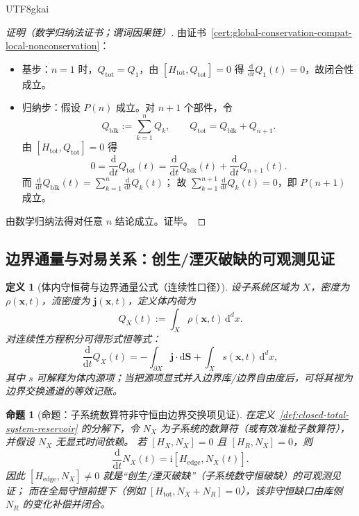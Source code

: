 \documentclass[12pt]{article}
\newtheorem{definition}{定义}[section]
\newtheorem{proposition}{命题}[section]
\begin{document}
\begin{CJK*}{UTF8}{gkai}
\begin{proof}[证明（数学归纳法证书；谓词因果链）]
由证书~\ref{cert:global-conservation-compat-local-nonconservation}：
\begin{itemize}
  \item 基步：$n=1$ 时，$Q_{\mathrm{tot}}=Q_1$，由 $[H_{\mathrm{tot}},Q_{\mathrm{tot}}]=0$ 得 $\frac{\mathrm{d}}{\mathrm{d}t}
    Q_1(t)=0$，故闭合性成立。
  \item 归纳步：假设 $P(n)$ 成立。对 $n+1$ 个部件，令
  \[
    Q_{\mathrm{blk}}:=\sum_{k=1}^{n}Q_k,\qquad Q_{\mathrm{tot}}=Q_{\mathrm{blk}}+Q_{n+1}.
  \]
  由 $[H_{\mathrm{tot}},Q_{\mathrm{tot}}]=0$ 得
  \[
    0=\frac{\mathrm{d}}{\mathrm{d}t}Q_{\mathrm{tot}}(t)=\frac{\mathrm{d}}{\mathrm{d}t}Q_{\mathrm{blk}}(t)
      +\frac{\mathrm{d}}{\mathrm{d}t}Q_{n+1}(t).
  \]
  而 $\frac{\mathrm{d}}{\mathrm{d}t}Q_{\mathrm{blk}}(t)=\sum_{k=1}^{n}\frac{\mathrm{d}}{\mathrm{d}t}Q_k(t)$；
  故 $\sum_{k=1}^{n+1}\frac{\mathrm{d}}{\mathrm{d}t}Q_k(t)=0$，即 $P(n+1)$ 成立。
\end{itemize}
由数学归纳法得对任意 $n$ 结论成立。证毕。
\end{proof}

\subsection{边界通量与对易关系：创生/湮灭破缺的可观测见证}
\label{sec:boundary-flux-and-commutator-witness}

\begin{definition}[体内守恒荷与边界通量公式（连续性口径）]
设子系统区域为 $X$，密度为 $\rho(\mathbf{x},t)$，流密度为 $\mathbf{j}(\mathbf{x},t)$，定义体内荷为
\[
  Q_X(t):=\int_{X}\rho(\mathbf{x},t)\,\mathrm{d}^d x.
\]
对连续性方程积分可得形式恒等式：
\[
  \frac{\mathrm{d}}{\mathrm{d}t}Q_X(t)
  =-\int_{\partial X}\mathbf{j}\cdot \mathrm{d}\mathbf{S}
  + \int_X s(\mathbf{x},t)\,\mathrm{d}^d x,
\]
其中 $s$ 可解释为体内源项；当把源项显式并入边界库/边界自由度后，可将其视为边界交换通道的等效记账。
\end{definition}

\begin{proposition}[命题：子系统数算符非守恒由边界交换项见证]
\label{prop:subsystem-number-nonconservation-witnessed-by-edge}
在定义~\ref{def:closed-total-system-reservoir} 的分解下，令 $N_X$ 为子系统的数算符（或有效准粒子数算符），并假设 $N_X$ 无显式时间依赖。
若 $[H_X,N_X]=0$ 且 $[H_R,N_X]=0$，则
\[
  \frac{\mathrm{d}}{\mathrm{d}t}N_X(t)=\mathrm{i}[H_{\mathrm{edge}},N_X(t)].
\]
因此 $[H_{\mathrm{edge}},N_X]\neq 0$ 就是“创生/湮灭破缺”（子系统数守恒破缺）的可观测见证；
而在全局守恒前提下（例如 $[H_{\mathrm{tot}},N_X+N_R]=0$），该非守恒缺口由库侧 $N_R$ 的变化补偿并闭合。
\end{proposition}


\end{CJK*}
\end{document}

